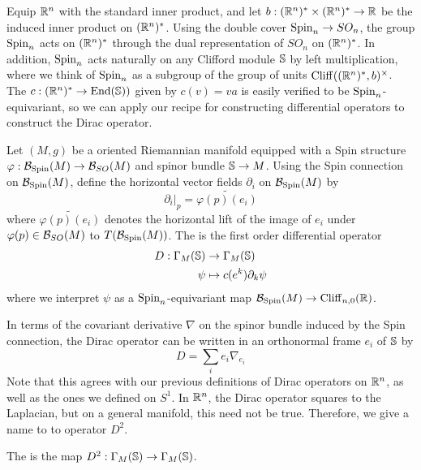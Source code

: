 Equip $\R^n$ with the standard inner product, and let
$b :(\R^n)^* \times (\R^n)^* \to \R$ be the induced inner product on $(\R^n)^*$.
Using the double cover $\Spin_n \to SO_n$, the group $\Spin_n$ acts on
$(\R^n)^*$ through the dual representation of $SO_n$ on $(\R^n)^*$. In addition,
$\Spin_n$ acts naturally on any Clifford module $\S$ by left multiplication, where
we think of $\Spin_n$ as a subgroup of the group of units
$\Cliff((\R^n)^*, b)^\times$. The 
$c : (\R^n)^* \to \End(\S))$ given by $c(v) = va$ is easily
verified to be $\Spin_n$-equivariant, so we can apply our recipe for
constructing differential operators to construct the Dirac operator.
%
\begin{defn}
 Let $(M,g)$ be a oriented Riemannian manifold equipped with a Spin structure
 $\varphi : \B_{\Spin}(M) \to \B_{SO}(M)$ and spinor bundle $\S \to M$.
 Using the Spin connection on $\B_{\Spin}(M)$, define the horizontal
 vector fields $\partial_i$ on $\B_{\Spin}(M)$ by
 \[
  \partial_i\vert_p = \widetilde{\varphi(p)(e_i)}
 \]
 where $\widetilde{\varphi(p)(e_i)}$ denotes the horizontal lift of the
 image of $e_i$ under $\varphi(p) \in \B_{SO}(M)$ to $T(\B_{\Spin}(M))$.
 The  is the first order differential operator
 \begin{align*}
  D : \Gamma_M(\S) & \to \Gamma_M(\S)          \\
  \psi                & \mapsto c(e^k)\partial_k\psi
 \end{align*}
 where we interpret $\psi$ as a $\Spin_n$-equivariant map
 $\B_{\Spin}(M) \to \Cliff_{n,0}(\R)$.
\end{defn}
In terms of the covariant derivative $\nabla$ on the spinor bundle induced by the Spin
connection, the Dirac operator can be written in an orthonormal frame $e_i$ of $\S$
by
\[
D = \sum_i e_i \nabla_{e_i}
\]
Note that this agrees with our previous definitions of Dirac operators on $\R^n$,
as well as the ones we defined on $S^1$. In $\R^n$, the Dirac operator squares to
the Laplacian, but on a general manifold, this need not be true. Therefore, we
give a name to to operator $D^2$.
%
\begin{defn}
The  is the map $D^2 : \Gamma_M(\S) \to \Gamma_M(\S)$.
\end{defn}

